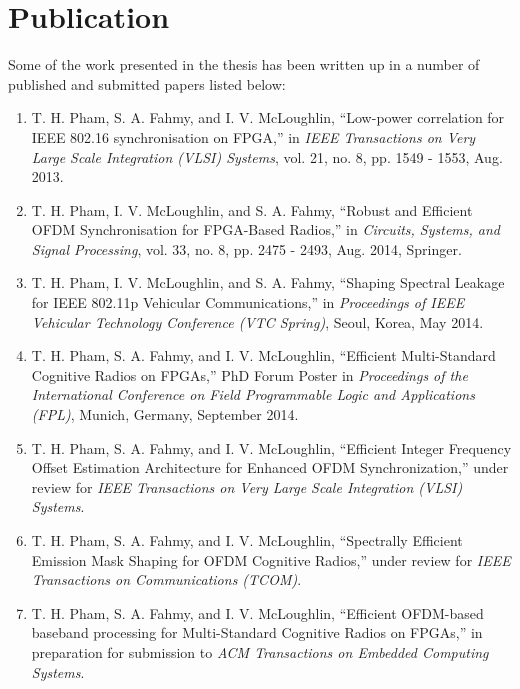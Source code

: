 \section{Publication}
Some of the work presented in the thesis has been written up in a number of published and submitted papers listed below:

\begin{enumerate}

\item  T. H. Pham, S. A. Fahmy, and I. V. McLoughlin, ``Low-power correlation for IEEE 802.16 synchronisation on FPGA,'' in \textit{IEEE Transactions on Very Large Scale Integration (VLSI) Systems}, vol. 21, no. 8, pp. 1549 - 1553, Aug. 2013.

\item T. H. Pham, I. V. McLoughlin, and S. A. Fahmy, ``Robust and Efficient OFDM Synchronisation for FPGA-Based Radios,'' in \textit{Circuits, Systems, and Signal Processing}, vol. 33, no. 8, pp. 2475 - 2493, Aug. 2014, Springer.

\item  T. H. Pham, I. V. McLoughlin, and S. A. Fahmy, ``Shaping Spectral Leakage for IEEE 802.11p Vehicular Communications,'' in \textit{Proceedings of IEEE Vehicular Technology Conference (VTC Spring)}, Seoul, Korea, May 2014.

\item T. H. Pham, S. A. Fahmy, and I. V. McLoughlin, ``Efficient Multi-Standard Cognitive Radios on FPGAs,'' PhD Forum Poster in \textit{Proceedings of the International Conference on Field Programmable Logic and Applications (FPL)}, Munich, Germany, September 2014.

\item T. H. Pham, S. A. Fahmy, and I. V. McLoughlin, ``Efficient Integer Frequency Offset Estimation Architecture for Enhanced OFDM Synchronization,'' under review for \textit{IEEE Transactions on Very Large Scale Integration (VLSI) Systems}.

\item T. H. Pham, S. A. Fahmy, and I. V. McLoughlin, ``Spectrally Efficient Emission Mask Shaping for OFDM Cognitive Radios,'' under review for \textit{IEEE Transactions on Communications (TCOM)}.

\item T. H. Pham, S. A. Fahmy, and I. V. McLoughlin, ``Efficient OFDM-based baseband processing for Multi-Standard Cognitive Radios on FPGAs,'' in preparation for submission to \emph{ACM Transactions on Embedded Computing Systems}.

\end{enumerate}